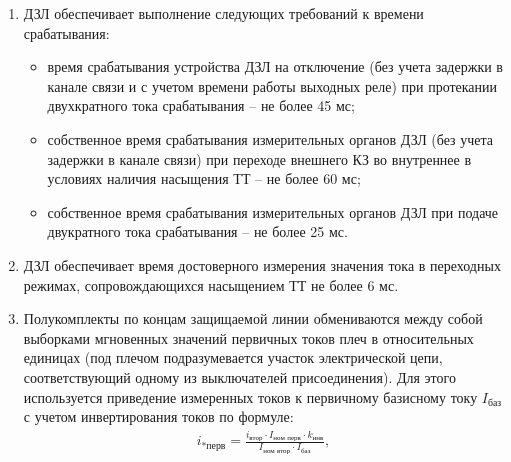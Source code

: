 \begin{enumerate}
\begin{enumerate}
\begin{itemize}
    \item при внешних КЗ с насыщением ТТ (при соблюдении заявленных производителем требований к ТТ).
  \end{itemize}
\item ДЗЛ обеспечивает выполнение следующих требований к времени срабатывания:
  \begin{itemize}
    \item время срабатывания устройства ДЗЛ на отключение (без учета задержки в канале связи и с учетом времени работы выходных реле) при протекании двухкратного тока срабатывания – не более 45 мс;
    \item собственное время срабатывания измерительных органов ДЗЛ (без учета задержки в канале связи) при переходе внешнего КЗ во внутреннее в условиях наличия насыщения ТТ – не более 60 мс;
    \item собственное время срабатывания измерительных органов ДЗЛ при подаче двукратного тока срабатывания – не более 25 мс.
  \end{itemize}
\item ДЗЛ обеспечивает время достоверного измерения значения тока в переходных режимах, сопровождающихся насыщением ТТ не более 6 мс.
\item Полукомплекты по концам защищаемой линии обмениваются между собой выборками мгновенных значений первичных токов плеч в относительных единицах (под плечом подразумевается участок электрической цепи, соответствующий одному из выключателей присоединения). Для этого используется приведение измеренных токов к первичному базисному току $ I_{\textit{баз}} $ с учетом инвертирования токов по формуле:
  \begin{align}
    i_{\textit{*перв}}=\frac{i_{\textit{втор}} \cdot I_{\textit{ном перв}} \cdot k_{\textit{инв}}}{I_{\textit{ном втор}} \cdot I_{\textit{баз}}},
  \end{align}
\end{enumerate}
\end{enumerate}
